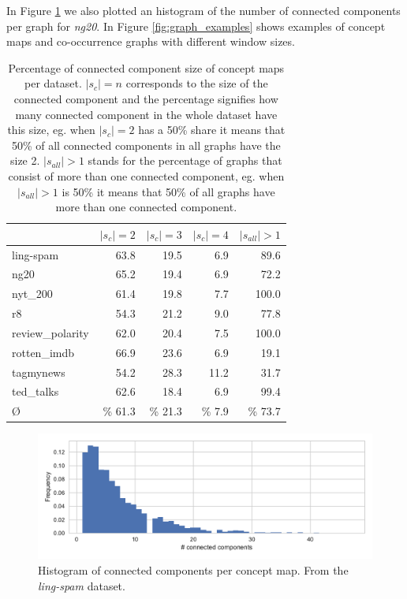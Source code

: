 In Figure \ref{fig:histogram_connected_components} we also plotted an histogram of the number of connected components per graph for \textit{ng20}.
In Figure \ref{fig:graph_examples} shows examples of concept maps and co-occurrence graphs with different window sizes.

\begin{table}[htb!]
\centering
\begin{tabular}{lrrrr}
	{} &  $|s_c|=2$ &  $|s_c|=3$ &  $|s_c|=4$ & $|s_{all}| > 1$ \\
	\midrule
	ling-spam       & 63.8 & 19.5 & 6.9 & 89.6 \\
	ng20            & 65.2 & 19.4 & 6.9 & 72.2 \\
	nyt\_200         & 61.4 & 19.8 & 7.7 & 100.0 \\
	r8              & 54.3 & 21.2 & 9.0 & 77.8 \\
	review\_polarity & 62.0 & 20.4 & 7.5 & 100.0 \\
	rotten\_imdb     & 66.9 & 23.6 & 6.9 & 19.1 \\
	tagmynews       & 54.2 & 28.3 & 11.2 & 31.7 \\
	ted\_talks       & 62.6 & 18.4 & 6.9 & 99.4 \\
	\midrule
	\O            & \% 61.3 & \% 21.3 & \% 7.9 & \% 73.7 \\
	\bottomrule
\end{tabular}
\caption[Statistics: Percentage of connected components size]{Percentage of connected component size of concept maps per dataset. $|s_c|=n$ corresponds to the size of the connected component and the percentage signifies how many connected component in the whole dataset have this size, eg. when $|s_c|=2$ has a 50\% share it means that 50\% of all connected components in all graphs have the size 2. $|s_{all}| > 1$ stands for the percentage of graphs that consist of more than one connected component, eg. when $|s_{all}| > 1$ is 50\% it means that 50\% of all graphs have more than one connected component.}\label{table:connected_component_percentage_per_size}
\end{table}

\begin{figure}[htb!]
\centering
\includegraphics[width=0.8\linewidth]{assets/figures/hist-connected-components-ling-spam-CMap.pdf}
\caption[Statistics: Histogram of connected components per concept map]{Histogram of connected components per concept map. From the \textit{ling-spam} dataset.}\label{fig:histogram_connected_components}
\end{figure}

